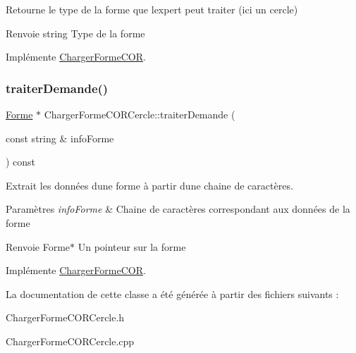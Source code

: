 Retourne le type de la forme que l\textquotesingle{}expert peut traiter (ici un cercle) 

\begin{DoxyReturn}{Renvoie}
string Type de la forme 
\end{DoxyReturn}


Implémente \mbox{\hyperlink{class_charger_forme_c_o_r_ae740eabcd9b3cc3809c1fe5ffd0100a1}{Charger\+Forme\+C\+OR}}.

\mbox{\label{class_charger_forme_c_o_r_cercle_ad65cbf0176ef4a65b44c5782646e45fa}} 
\subsubsection{\texorpdfstring{traiterDemande()}{traiterDemande()}}
{\footnotesize\ttfamily \mbox{\hyperlink{class_forme}{Forme}} $\ast$ Charger\+Forme\+C\+O\+R\+Cercle\+::traiter\+Demande (\begin{DoxyParamCaption}\item[{const string \&}]{info\+Forme }\end{DoxyParamCaption}) const\hspace{0.3cm}{\ttfamily [virtual]}}



Extrait les données d\textquotesingle{}une forme à partir d\textquotesingle{}une chaine de caractères. 


\begin{DoxyParams}{Paramètres}
{\em info\+Forme} & Chaine de caractères correspondant aux données de la forme \\
\hline
\end{DoxyParams}
\begin{DoxyReturn}{Renvoie}
Forme$\ast$ Un pointeur sur la forme 
\end{DoxyReturn}


Implémente \mbox{\hyperlink{class_charger_forme_c_o_r_a1d9563c3a1ff9d6d86aa87a83bdaf8da}{Charger\+Forme\+C\+OR}}.



La documentation de cette classe a été générée à partir des fichiers suivants \+:\begin{DoxyCompactItemize}
\item 
Charger\+Forme\+C\+O\+R\+Cercle.\+h\item 
Charger\+Forme\+C\+O\+R\+Cercle.\+cpp\end{DoxyCompactItemize}
